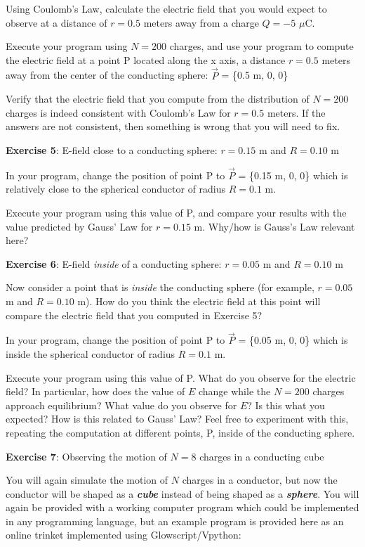 \documentclass[]{article}
\begin{document}
Using Coulomb's Law, calculate the electric field that you would expect
to observe at a distance of \(r = 0.5\) meters away from a charge
\(Q = -5\) \(\mu\)C.

Execute your program using \(N = 200\) charges, and use your program to
compute the electric field at a point P located along the x axis, a
distance \(r = 0.5\) meters away from the center of the conducting
sphere: \(\vec{P}\) = \{0.5 m, 0, 0\}

Verify that the electric field that you compute from the distribution of
\(N = 200\) charges is indeed consistent with Coulomb's Law for
\(r = 0.5\) meters. If the answers are not consistent, then something is
wrong that you will need to fix.

\textbf{Exercise 5}: E-field close to a conducting sphere: \(r = 0.15\)
m and \(R = 0.10\) m

In your program, change the position of point P to \(\vec{P}\) = \{0.15
m, 0, 0\} which is relatively close to the spherical conductor of radius
\(R = 0.1\) m.

Execute your program using this value of P, and compare your results
with the value predicted by Gauss' Law for \(r = 0.15\) m. Why/how is
Gauss's Law relevant here?

\textbf{Exercise 6}: E-field \emph{inside} of a conducting sphere:
\(r = 0.05\) m and \(R = 0.10\) m

Now consider a point that is \emph{inside} the conducting sphere (for
example, \(r = 0.05\) m and \(R = 0.10\) m). How do you think the
electric field at this point will compare the electric field that you
computed in Exercise 5?

In your program, change the position of point P to \(\vec{P}\) = \{0.05
m, 0, 0\} which is inside the spherical conductor of radius \(R = 0.1\)
m.

Execute your program using this value of P. What do you observe for the
electric field? In particular, how does the value of \(E\) change while
the \(N = 200\) charges approach equilibrium? What value do you observe
for \(E\)? Is this what you expected? How is this related to Gauss' Law?
Feel free to experiment with this, repeating the computation at
different points, P, inside of the conducting sphere.

\textbf{Exercise 7}: Observing the motion of \(N = 8\) charges in a
conducting cube

You will again simulate the motion of \(N\) charges in a conductor, but
now the conductor will be shaped as a \textbf{\emph{cube}} instead of
being shaped as a \textbf{\emph{sphere}}. You will again be provided
with a working computer program which could be implemented in any
programming language, but an example program is provided here as an
online trinket implemented using Glowscript/Vpython:
\end{document}
